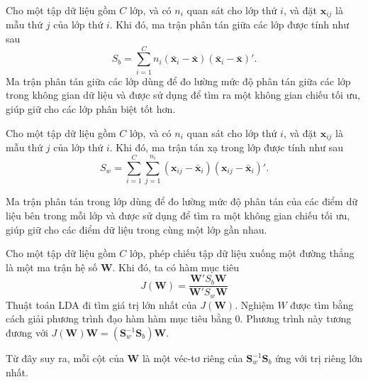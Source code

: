 \begin{definition}
	Cho một tập dữ liệu gồm $C$ lớp, và có $n_i$ quan sát cho lớp thứ $i$, và đặt $\boldsymbol{x}_{ij}$ là mẫu thứ $j$ của lớp thứ $i$. Khi đó, ma trận phân tán giữa các lớp được tính như sau
	\begin{equation}
		S_b = \sum_{i=1}^Cn_i(\bar{\boldsymbol{x} }_i-\bar{\boldsymbol{x} })(\bar{\boldsymbol{x} }_i-\bar{\boldsymbol{x} })'.
	\end{equation}
	Ma trận phân tán giữa các lớp dùng để đo lường mức độ phân tán giữa các lớp trong không gian dữ liệu và được sử dụng để tìm ra một không gian chiếu tối ưu, giúp giữ cho các lớp phân biệt tốt hơn.
\end{definition}
\begin{definition}
	Cho một tập dữ liệu gồm $C$ lớp, và có $n_i$ quan sát cho lớp thứ $i$, và đặt $\boldsymbol{x}_{ij}$ là mẫu thứ $j$ của lớp thứ $i$. Khi đó, ma trận tán xạ trong lớp được tính như sau
	\begin{equation}
		S_w = \sum_{i=1}^C\sum_{j=1}^{n_i}( {\boldsymbol{x}  }_{ij}-\bar{\boldsymbol{x} }_i)({\boldsymbol{x} }_{ij}-\bar{\boldsymbol{x} }_i)'.
	\end{equation}

	Ma trận phân tán trong lớp dùng để đo lường mức độ phân tán của các điểm dữ liệu bên trong mỗi lớp và được sử dụng để tìm ra một không gian chiếu tối ưu, giúp giữ cho các điểm dữ liệu trong cùng một lớp gần nhau.
\end{definition}

\begin{definition}
	
Cho một tập dữ liệu gồm $C$ lớp, phép chiếu tập dữ liệu xuống một đường thẳng là một ma trận hệ số $\boldsymbol{W}$.
Khi đó, ta có hàm mục tiêu
\begin{equation}
	J(\boldsymbol{W}) = \frac{\boldsymbol{W}'S_b\boldsymbol{W}}{\boldsymbol{W}'S_w\boldsymbol{W}}
\end{equation}
Thuật toán LDA đi tìm giá trị lớn nhất của $J(\boldsymbol{W})$. Nghiệm $W$ được tìm bằng cách giải phương trình đạo hàm hàm mục tiêu bằng $0$. Phương trình này tương đương với $J(\boldsymbol{W}) \boldsymbol{W} = \left(\boldsymbol{S}_w^{-1} \boldsymbol{S}_b\right) \boldsymbol{W}$.

Từ đây suy ra, mỗi cột của $\boldsymbol{W}$ là một véc-tơ riêng của $\boldsymbol{S}_w^{-1} \boldsymbol{S}_b$ ứng với trị riêng lớn nhất.
\end{definition}

